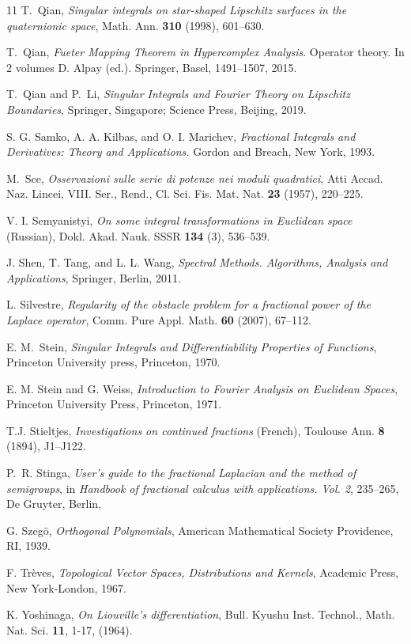 \documentclass[reqno,11pt]{amsart}
\theoremstyle{definition}
\begin{document}
\begin{thebibliography}{11}
T.~Qian, \emph{Singular integrals on star-shaped Lipschitz surfaces in the quaternionic space},
Math. Ann. \textbf{310} (1998), 601--630.	

T.~Qian,
\textit{Fueter Mapping Theorem in Hypercomplex Analysis}.
Operator theory. In 2 volumes D. Alpay (ed.).  Springer, Basel, 1491--1507, 2015.

T.~Qian and P.~Li,
\textit{Singular Integrals and Fourier Theory on Lipschitz Boundaries},
Springer, Singapore; Science Press, Beijing, 2019.




S. G. Samko, A. A. Kilbas, and O. I. Marichev,
\textit{Fractional Integrals and Derivatives: Theory and Applications.}
Gordon {and} Breach, New York, 1993.


M.~Sce,
\textit{Osservazioni sulle serie di potenze nei moduli quadratici},
Atti Accad. Naz. Lincei, VIII. Ser., Rend., Cl. Sci. Fis. Mat. Nat. \textbf{23} (1957), 220--225.
	
V. I. Semyanistyi,
\textit{On some integral transformations in Euclidean space} (Russian),
Dokl. Akad. Nauk. SSSR \textbf{134} (3), 536--539.
	

J. Shen, T. Tang, and L. L. Wang,
\textit{Spectral Methods. {Algorithms}, Analysis and Applications}, Springer, Berlin, 2011.



 L. Silvestre, \textit{Regularity of the obstacle problem for a fractional power of
the Laplace operator},
Comm. Pure Appl. Math. \textbf{60} (2007), 67–112.
	

E. M.~Stein,
\textit{Singular Integrals and Differentiability Properties of Functions}, Princeton University press, Princeton, 1970.
	
E. M. Stein and G. Weiss,
\textit{Introduction to {Fourier} Analysis on {Euclidean} Spaces},
Princeton University Press, Princeton, 1971.
	
T.J. Stieltjes,
\textit{Investigations on continued fractions} (French),
Toulouse Ann. \textbf{8} (1894), J1--J122.

P.~R. Stinga, \textit{User's guide to the fractional Laplacian and the method of semigroups}, in {\it Handbook of fractional calculus with applications. Vol. 2}, 235--265, De Gruyter, Berlin,
	

G. Szeg\"o,
\textit{Orthogonal Polynomials}, American Mathematical Society Providence, RI, 1939.


F. Tr\`eves,
\textit{Topological Vector Spaces, Distributions and Kernels}, Academic Press, New York-London, 1967.


K. Yoshinaga,
\textit{On Liouville's differentiation},
Bull. Kyushu Inst. Technol., Math. Nat. Sci. \textbf{11}, 1-17, (1964).


	
	

\end{thebibliography}
	
	
\end{document}

